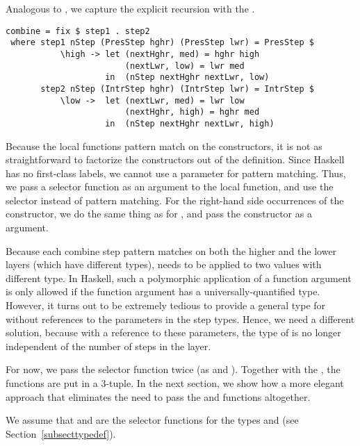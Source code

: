Analogous to , we capture the explicit recursion with the .

\begin{small} %
\begin{verbatim}
combine = fix $ step1 . step2
 where step1 nStep (PresStep hghr) (PresStep lwr) = PresStep $
           \high -> let (nextHghr, med) = hghr high
                        (nextLwr, low) = lwr med
                    in  (nStep nextHghr nextLwr, low)
       step2 nStep (IntrStep hghr) (IntrStep lwr) = IntrStep $
           \low ->  let (nextLwr, med) = lwr low
                        (nextHghr, high) = hghr med
                    in  (nStep nextHghr nextLwr, high)
\end{verbatim}
\end{small}

Because the local functions pattern match on the constructors, it is not as straightforward to factorize the constructors out of the definition. Since Haskell has no first-class labels, we cannot use a parameter for pattern matching. Thus, we pass a selector function  as an argument to the local function, and use the selector instead of pattern matching. For the right-hand side occurrences of the constructor, we do the same thing as for , and pass the constructor as a  argument.


Because each combine step pattern matches on both the higher and the lower layers (which have different types),  needs to be applied to two values with different type. In Haskell, such a polymorphic application of a function argument is only allowed if the function argument has a universally-quantified type. However, it turns out to be extremely tedious to provide a general type for  without references to the parameters in the step types. Hence, we need a different solution, because with a reference to these parameters, the type of  is no longer independent of the number of steps in the layer.

For now, we pass the selector function twice (as  and ).  Together with the , the  functions are put in a 3-tuple. In the next section, we show how a more elegant approach that eliminates the need to pass the  and  functions altogether.

We assume that  and  are the selector functions for the types  and  (see Section~\ref{subsecttypedef}).

